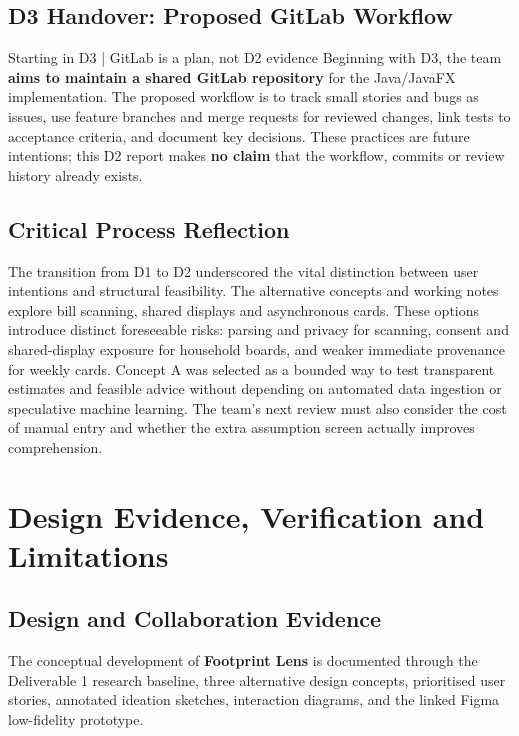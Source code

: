 \documentclass[12pt,a4paper]{article}
\begin{document}
\subsection{D3 Handover: Proposed GitLab Workflow}
\begin{insightbox}{Starting in D3 | GitLab is a plan, not D2 evidence}
Beginning with D3, the team \textbf{aims to maintain a shared GitLab repository} for the Java/JavaFX implementation. The proposed workflow is to track small stories and bugs as issues, use feature branches and merge requests for reviewed changes, link tests to acceptance criteria, and document key decisions. These practices are future intentions; this D2 report makes \textbf{no claim} that the workflow, commits or review history already exists.
\end{insightbox}

\subsection{Critical Process Reflection}
The transition from D1 to D2 underscored the vital distinction between user intentions and structural feasibility. The alternative concepts and working notes explore bill scanning, shared displays and asynchronous cards. These options introduce distinct foreseeable risks: parsing and privacy for scanning, consent and shared-display exposure for household boards, and weaker immediate provenance for weekly cards. Concept A was selected as a bounded way to test transparent estimates and feasible advice without depending on automated data ingestion or speculative machine learning. The team's next review must also consider the cost of manual entry and whether the extra assumption screen actually improves comprehension.


\clearpage
\section{Design Evidence, Verification and Limitations}
\label{sec:design-evidence}

\subsection{Design and Collaboration Evidence}

The conceptual development of \textbf{Footprint Lens} is documented through the Deliverable 1 research baseline, three alternative design concepts, prioritised user stories, annotated ideation sketches, interaction diagrams, and the linked Figma low-fidelity prototype.
\end{document}
